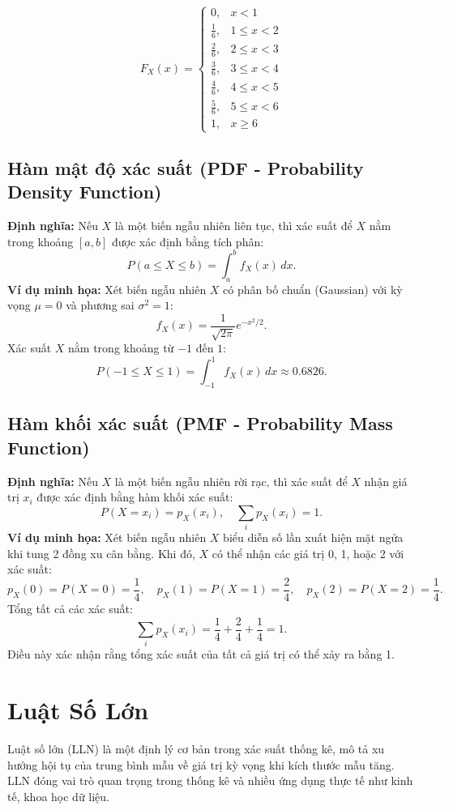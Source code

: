 \[
F_X(x) = \begin{cases}
    0, & x < 1 \\
    \frac{1}{6}, & 1 \leq x < 2 \\
    \frac{2}{6}, & 2 \leq x < 3 \\
    \frac{3}{6}, & 3 \leq x < 4 \\
    \frac{4}{6}, & 4 \leq x < 5 \\
    \frac{5}{6}, & 5 \leq x < 6 \\
    1, & x \geq 6
\end{cases}
\]

\subsection{Hàm mật độ xác suất (PDF - Probability Density Function)}
\textbf{Định nghĩa:} Nếu $X$ là một biến ngẫu nhiên liên tục, thì xác suất để $X$ nằm trong khoảng $[a,b]$ được xác định bằng tích phân:
\[ P(a \leq X \leq b) = \int_{a}^{b} f_X(x) \,dx. \]
\textbf{Ví dụ minh họa:} Xét biến ngẫu nhiên $X$ có phân bố chuẩn (Gaussian) với kỳ vọng $\mu=0$ và phương sai $\sigma^2=1$:
\[ f_X(x) = \frac{1}{\sqrt{2\pi}} e^{-x^2/2}. \]
Xác suất $X$ nằm trong khoảng từ $-1$ đến $1$:
\[ P(-1 \leq X \leq 1) = \int_{-1}^{1} f_X(x) \,dx \approx 0.6826. \]

\subsection{Hàm khối xác suất (PMF - Probability Mass Function)}
\textbf{Định nghĩa:} Nếu $X$ là một biến ngẫu nhiên rời rạc, thì xác suất để $X$ nhận giá trị $x_i$ được xác định bằng hàm khối xác suất:
\[ P(X = x_i) = p_X(x_i), \quad \sum_{i} p_X(x_i) = 1. \]
\textbf{Ví dụ minh họa:} Xét biến ngẫu nhiên $X$ biểu diễn số lần xuất hiện mặt ngửa khi tung 2 đồng xu cân bằng. Khi đó, $X$ có thể nhận các giá trị 0, 1, hoặc 2 với xác suất:
\[
 p_X(0) = P(X=0) = \frac{1}{4}, \quad p_X(1) = P(X=1) = \frac{2}{4}, \quad p_X(2) = P(X=2) = \frac{1}{4}.
\]
Tổng tất cả các xác suất:
\[ \sum_{i} p_X(x_i) = \frac{1}{4} + \frac{2}{4} + \frac{1}{4} = 1. \]
Điều này xác nhận rằng tổng xác suất của tất cả giá trị có thể xảy ra bằng 1.

\section{Luật Số Lớn}
Luật số lớn (LLN) là một định lý cơ bản trong xác suất thống kê, mô tả xu hướng hội tụ của trung bình mẫu về giá trị kỳ vọng khi kích thước mẫu tăng. LLN đóng vai trò quan trọng trong thống kê và nhiều ứng dụng thực tế như kinh tế, khoa học dữ liệu.

